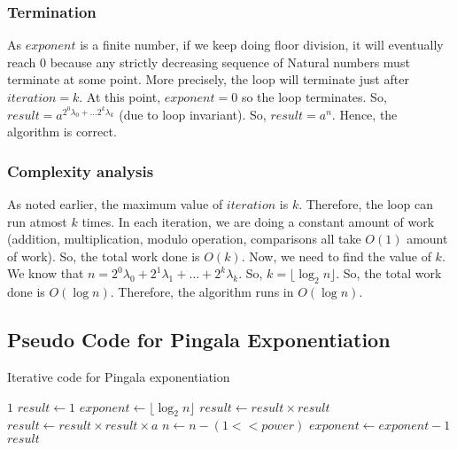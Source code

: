 \documentclass{article}
\begin{document}
\subsubsection*{Termination}
As $exponent$ is a finite number, if we keep doing floor division, it will eventually reach $0$ because any strictly decreasing sequence of Natural numbers must terminate at some point. More precisely, the loop will terminate just after $iteration = k$. At this point, $exponent = 0$ so the loop terminates. So, $result = a^{2^0\lambda_0 + \ldots 2^{k}\lambda_{k}}$ (due to loop invariant). So, $result = a^n$. Hence, the algorithm is correct.

\subsubsection*{Complexity analysis}
As noted earlier, the maximum value of $iteration$ is $k$. Therefore, the loop can run atmost $k$ times. In each iteration, we are doing a constant amount of work (addition, multiplication, modulo operation, comparisons all take $O(1)$ amount of work). So, the total work done is $O(k)$. Now, we need to find the value of $k$. We know that $n = 2^0\lambda_0 + 2^1\lambda_1 + \ldots + 2^k\lambda_k$. So, $k = \lfloor \log_2 n \rfloor$. So, the total work done is $O(\log n)$. Therefore, the algorithm runs in $O(\log n)$.

\subsection*{Pseudo Code for Pingala Exponentiation}
\begin{algorithm}
    \caption{Iterative code for Pingala exponentiation}
    \begin{algorithmic}
                \State \Return $1$
            \EndIf
            \State $result \gets 1$
            \State $exponent \gets \lfloor \log_2n \rfloor$
                    \State $result \gets result \times result$
                \Else
                    \State $result \gets result \times result \times a$
                    \State $n \gets n - (1 << power)$
                \EndIf
                \State $exponent \gets exponent - 1$
            \EndWhile
            \State \Return $result$
        \EndFunction
    \end{algorithmic}
\end{algorithm}
\end{document}
